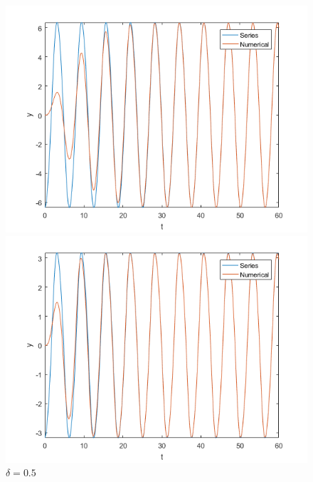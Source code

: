 \documentclass[10pt,a4paper]{report}
\begin{document}
\begin{figure}[ht]
\begin{minipage}[b]{0.5\linewidth}
\centering
\includegraphics[width=\textwidth]{q8d025.png}
\caption{$\delta=0.25$}
\label{fig:figure1}
\end{minipage}
\hspace{0.5cm}
\begin{minipage}[b]{0.5\linewidth}
\centering
\includegraphics[width=\textwidth]{q8d05.png}
\caption{$\delta=0.5$}
\label{fig:figure2}
\end{minipage}
\end{figure}
\end{document}
